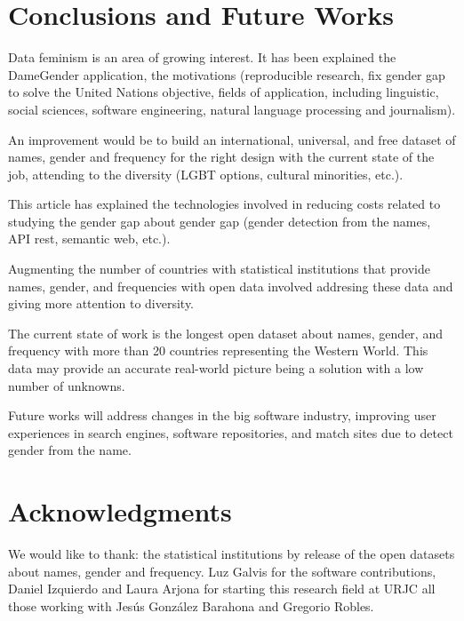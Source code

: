 \documentclass[a4paper]{article}
\begin{document}

\section{Conclusions and Future Works}
\label{sec:conclusions}

Data feminism\cite{d2020data} is an area of growing interest.
It has been explained the DameGender application,
the motivations (reproducible research, fix gender gap to solve the
United Nations objective, fields of application, including linguistic,
social sciences, software engineering, natural language processing and
journalism).

An improvement would be to build an international, universal, and free
dataset of names, gender and frequency for the right design with
the current state of the job, attending to the diversity (LGBT
options, cultural minorities, etc.).

This article has explained the technologies involved in reducing costs
related to studying the gender gap about gender gap (gender detection
from the names, API rest, semantic web, etc.).

Augmenting the number of countries with statistical institutions
that provide names, gender, and frequencies with open data
involved addresing these data and giving more attention to
diversity.

The current state of work is the longest open dataset about names,
gender, and frequency with more than 20 countries representing the
Western World. This data may provide an accurate real-world picture
being a solution with a low number of unknowns.

Future works will address changes in the big software industry,
improving user experiences in search engines, software repositories,
and match sites due to detect gender from the name.


\section*{Acknowledgments}

We would like to thank: the statistical institutions by
release of the open datasets about names, gender and frequency.
Luz Galvis for the software contributions, Daniel Izquierdo and
Laura Arjona for starting this research field at URJC all those
working with Jesús González Barahona and Gregorio Robles. 



\end{document}
